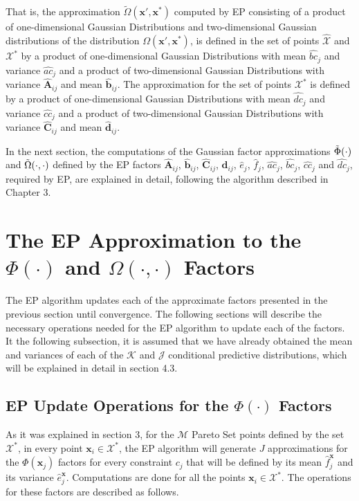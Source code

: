That is, the approximation $\tilde{\Omega}(\boldsymbol{x}',\boldsymbol{x}^*)$ computed by EP consisting of a product of one-dimensional Gaussian Distributions and two-dimensional Gaussian distributions of the distribution $\Omega(\boldsymbol{x}',\boldsymbol{x}^*)$, is defined in the set of points $\hat{\mathcal{X}}$ and $\mathcal{X}^*$ by a product of one-dimensional Gaussian Distributions with mean $\hat{bc}_j$ and variance $\hat{ac}_j$ and a product of two-dimensional Gaussian Distributions with variance $\hat{\boldsymbol{A}}_{ij}$ and mean $\hat{\boldsymbol{b}}_{ij}$. The approximation for the set of points $\mathcal{X}^*$ is defined by a product of one-dimensional Gaussian Distributions with mean $\hat{dc}_j$ and variance $\hat{cc}_j$ and a product of two-dimensional Gaussian Distributions with variance $\hat{\boldsymbol{C}}_{ij}$ and mean $\hat{\boldsymbol{d}}_{ij}$.

In the next section, the computations of the Gaussian factor approximations $\Tilde{\Phi}(\cdot)$ and $\Tilde{\Omega}(\cdot,\cdot)$ defined by the EP factors $\hat{\boldsymbol{A}}_{ij}$, $\hat{\boldsymbol{b}}_{ij}$, $\hat{\boldsymbol{C}}_{ij}$, $\hat{\boldsymbol{d}}_{ij}$, $\hat{e}_{j}$, $\hat{f}_{j}$, $\hat{ac}_j$, $\hat{bc}_j$, $\hat{cc}_j$ and $\hat{dc}_j$, required by EP, are explained in detail, following the algorithm described in Chapter 3.

\section{The EP Approximation to the $\Phi(\cdot)$ and $\Omega(\cdot,\cdot)$ Factors}

The EP algorithm updates each of the approximate factors presented in the previous section until convergence. The following sections will describe the necessary operations needed for the EP algorithm to update each of the factors. It the following subsection, it is assumed that we have already obtained the mean and variances of each of the $\mathcal{K}$ and $\mathcal{J}$ conditional predictive distributions, which will be explained in detail in section 4.3.

\subsection{EP Update Operations for the $\Phi(\cdot)$ Factors}

As it was explained in section 3, for the $\mathcal{M}$ Pareto Set points defined by the set $\mathcal{X}^*$, in every point $\boldsymbol{x}_i \in \mathcal{X}^*$, the EP algorithm will generate $J$ approximations for the $\Phi(\boldsymbol{x}_j)$ factors for every constraint $c_j$ that will be defined by its mean $\hat{f}_{j}^{\boldsymbol{x}}$ and its variance $\hat{e}_{j}^{\boldsymbol{x}}$. Computations are done for all the points $\boldsymbol{x}_i \in \mathcal{X}^*$. The operations for these factors are described as follows.

